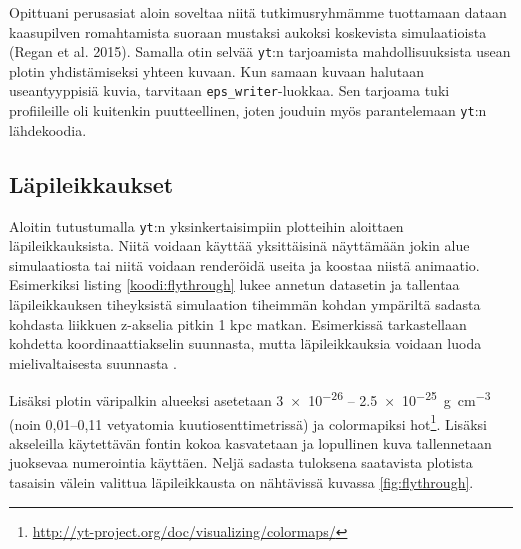 \documentclass[12pt,a4paper]{article}
\newcommand{\yt}{\texttt{yt}}
\begin{document}
Opittuani perusasiat aloin soveltaa niitä tutkimusryhmämme tuottamaan dataan kaasupilven romahtamista suoraan mustaksi aukoksi koskevista simulaatioista (Regan et al. 2015). Samalla otin selvää \yt :n tarjoamista mahdollisuuksista usean plotin yhdistämiseksi yhteen kuvaan. Kun samaan kuvaan halutaan useantyyppisiä kuvia, tarvitaan \texttt{eps\_writer}-luokkaa. Sen tarjoama tuki profiileille oli kuitenkin puutteellinen, joten jouduin myös parantelemaan \yt :n lähdekoodia.

\subsection{Läpileikkaukset}
Aloitin tutustumalla \yt :n yksinkertaisimpiin plotteihin aloittaen läpileikkauksista. Niitä voidaan käyttää yksittäisinä näyttämään jokin alue simulaatiosta tai niitä voidaan renderöidä useita ja koostaa niistä animaatio. Esimerkiksi listing \ref{koodi:flythrough} lukee annetun datasetin ja tallentaa läpileikkauksen tiheyksistä simulaation tiheimmän kohdan ympäriltä sadasta kohdasta liikkuen z-akselia pitkin 1 kpc matkan. Esimerkissä tarkastellaan kohdetta koordinaattiakselin suunnasta, mutta läpileikkauksia voidaan luoda mielivaltaisesta suunnasta \cite{sliceproj}.

Lisäksi plotin väripalkin alueeksi asetetaan \SI{3e-26}{} -- \SI{2.5e-25}{\gram\per\cubic\centi\metre} (noin 0,01--0,11 vetyatomia kuutiosenttimetrissä)
ja colormapiksi hot\footnote{\url{http://yt-project.org/doc/visualizing/colormaps/}}. Lisäksi akseleilla käytettävän fontin kokoa kasvatetaan ja lopullinen kuva tallennetaan juoksevaa numerointia käyttäen. Neljä sadasta tuloksena saatavista plotista tasaisin välein valittua läpileikkausta on nähtävissä kuvassa \ref{fig:flythrough}.

\begin{minipage}{\linewidth}

\end{minipage}
\end{document}
